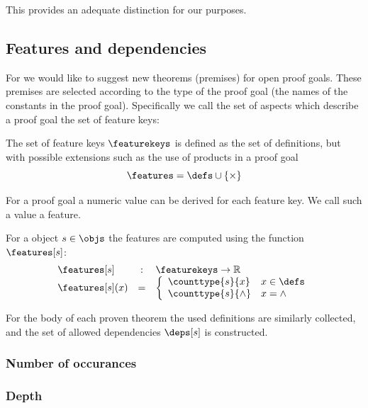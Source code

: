 This provides an adequate distinction for our purposes.

\subsection{Features and dependencies}
\label{section:featsdeps}

For \premiseselection we would like to suggest new theorems (premises) for open proof goals.
These premises are selected according to the type of the proof goal (the names of the constants in the proof goal).
Specifically we call the set of aspects which describe a proof goal the set of feature keys:

\begin{definition}\label{def:featurekeys}
  The set of feature keys $\featurekeys$ is defined as the set of definitions, but with possible extensions such as the use of products in a proof goal
  \[ \features = \defs \cup \{ \times \} \]
\end{definition}

For a proof goal a numeric value can be derived for each feature key.
We call such a value a feature.

\begin{definition}\label{def:features}
  For a \coq object $s \in \objs$ the features are computed using the function $\features[s]$:
  $$
  \begin{array}{lcl}
    \features[s] & : & \featurekeys \rightarrow \mathbb{R} \\
    \features[s](x) & = & \left\{
      \begin{array}{ll}
        \counttype{s}{x} & x \in \defs \\
        \counttype{s}{\wedge} & x = \wedge
      \end{array} \right.
  \end{array}
  $$
\end{definition}



For the body of each proven theorem the used definitions are similarly collected, and the set of allowed dependencies $\deps[s]$ is constructed.

\subsubsection{Number of occurances}
\label{section:countoccur}

\subsubsection{Depth}
\label{section:depth}

